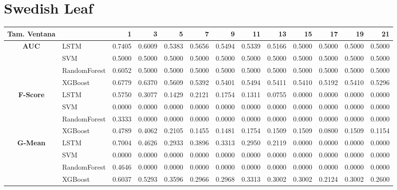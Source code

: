 \section{Swedish Leaf}
\begin{table}[h]
\centering
\begin{adjustbox}{max width=15cm}
	\begin{tabular}{|c|l|r|r|r|r|r|r|r|r|r|r|r|}
		\hline
		\textbf{Tam. Ventana} &         &      1  &      3  &      5  &      7  &      9  &      11 &      13 &      15 &      17 &      19 &      21 \\
		\hline
		\textbf{AUC} & LSTM &  0.7405 &  0.6009 &  0.5383 &  0.5656 &  0.5494 &  0.5339 &  0.5166 &  0.5000 &  0.5000 &  0.5000 &  0.5000 \\
		& SVM &  0.5000 &  0.5000 &  0.5000 &  0.5000 &  0.5000 &  0.5000 &  0.5000 &  0.5000 &  0.5000 &  0.5000 &  0.5000 \\
		& RandomForest &  0.6052 &  0.5000 &  0.5000 &  0.5000 &  0.5000 &  0.5000 &  0.5000 &  0.5000 &  0.5000 &  0.5000 &  0.5000 \\
		& XGBoost &  0.6779 &  0.6370 &  0.5609 &  0.5392 &  0.5401 &  0.5494 &  0.5411 &  0.5410 &  0.5192 &  0.5410 &  0.5296 \\
		\hline
		\textbf{F-Score} & LSTM &  0.5750 &  0.3077 &  0.1429 &  0.2121 &  0.1754 &  0.1311 &  0.0755 &  0.0000 &  0.0000 &  0.0000 &  0.0000 \\
		& SVM &  0.0000 &  0.0000 &  0.0000 &  0.0000 &  0.0000 &  0.0000 &  0.0000 &  0.0000 &  0.0000 &  0.0000 &  0.0000 \\
		& RandomForest &  0.3333 &  0.0000 &  0.0000 &  0.0000 &  0.0000 &  0.0000 &  0.0000 &  0.0000 &  0.0000 &  0.0000 &  0.0000 \\
		& XGBoost &  0.4789 &  0.4062 &  0.2105 &  0.1455 &  0.1481 &  0.1754 &  0.1509 &  0.1509 &  0.0800 &  0.1509 &  0.1154 \\
		\hline
		\textbf{G-Mean} & LSTM &  0.7004 &  0.4626 &  0.2933 &  0.3896 &  0.3313 &  0.2950 &  0.2119 &  0.0000 &  0.0000 &  0.0000 &  0.0000 \\
		& SVM &  0.0000 &  0.0000 &  0.0000 &  0.0000 &  0.0000 &  0.0000 &  0.0000 &  0.0000 &  0.0000 &  0.0000 &  0.0000 \\
		& RandomForest &  0.4646 &  0.0000 &  0.0000 &  0.0000 &  0.0000 &  0.0000 &  0.0000 &  0.0000 &  0.0000 &  0.0000 &  0.0000 \\
		& XGBoost &  0.6037 &  0.5293 &  0.3596 &  0.2966 &  0.2968 &  0.3313 &  0.3002 &  0.3002 &  0.2124 &  0.3002 &  0.2600 \\

\end{tabular}
\end{adjustbox}
\end{table}

